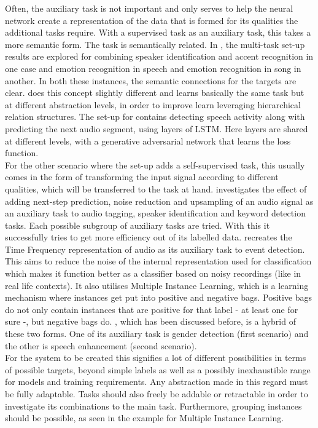 Often, the auxiliary task is not important and only serves to help the neural network create a representation of the data that is formed for its qualities the additional tasks require. With a supervised task as an auxiliary task, this takes a more semantic form. The task is semantically related. In \cite{zeng2019spectrogram}, the multi-task set-up results are explored for combining speaker identification and accent recognition in one case and emotion recognition in speech and emotion recognition in song in another. In both these instances, the semantic connections for the targets are clear.  \cite{abrol2020learning} does this concept slightly different and learns basically the same task but at different abstraction levels, in order to improve learn leveraging hierarchical relation structures. The set-up for \cite{fernando2020temporarily} contains detecting speech activity along with predicting the next audio segment, using layers of LSTM. Here layers  are shared at different levels, with a generative adversarial network that learns the loss function.\\


For the other scenario where the set-up adds a self-supervised task, this usually comes in the form of transforming the input signal according to different qualities, which will be transferred to the task at hand. \cite{lee2019label} investigates the effect of adding next-step prediction, noise reduction and upsampling of an audio signal as an auxiliary task to audio tagging, speaker identification and keyword detection tasks. Each possible subgroup of auxiliary tasks are tried.  With this it successfully tries to get more efficiency out of its labelled data. \cite{deshmukh2020multi} recreates the Time Frequency representation of audio as its auxiliary task to event detection. This aims to reduce the noise of the internal representation used for classification which makes it function better as a classifier based on noisy recordings (like in real life contexts). It also utilises Multiple Instance Learning, which is a learning mechanism where instances get put into positive and negative bags.  Positive bags do not only contain instances that are positive for that label - at least one for sure -, but negative bags do. \cite{lu2004multitask}, which has been discussed before, is a hybrid of these two forms. One of its auxiliary task is gender detection (first scenario) and the other is speech enhancement (second scenario). \\

For the system to be created this signifies a lot of different possibilities in terms of possible targets, beyond simple labels as well as a possibly inexhaustible range for models and training requirements. Any abstraction made in this regard must be fully adaptable. Tasks should also freely be addable or retractable in order to investigate its combinations to the main task. Furthermore, grouping instances should be possible, as seen in the example for Multiple Instance Learning. \\


